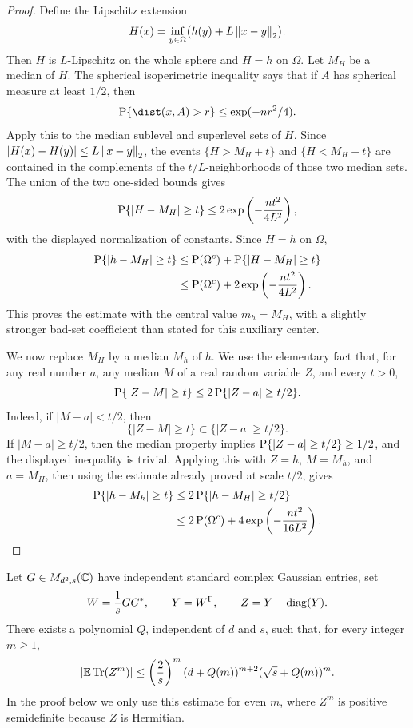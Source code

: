 \begin{proof}
Define the Lipschitz extension
\[
    H(x)=\inf_{y\in\Omega}\bigl(h(y)+L\left\lVert x-y\right\rVert_2\bigr).
\]
Then \(H\) is \(L\)-Lipschitz on the whole sphere and \(H=h\) on \(\Omega\).
Let \(M_H\) be a median of \(H\).  The spherical isoperimetric inequality says
that if \(A\) has spherical measure at least \(1/2\), then
\[
    \Prob\{\dist(x,A)>r\}\le \exp(-nr^2/4).
\]
Apply this to the median sublevel and superlevel sets of \(H\).  Since
\(|H(x)-H(y)|\le L\left\lVert x-y\right\rVert_2\), the events
\(\{H>M_H+t\}\) and \(\{H<M_H-t\}\) are contained in the complements of the
\(t/L\)-neighborhoods of those two median sets.  The union of the two
one-sided bounds gives
\[
    \operatorname{P}\{|H-M_H|\ge t\}
    \le 2\exp\left(-\frac{nt^2}{4L^2}\right),
\]
with the displayed normalization of constants.  Since \(H=h\) on \(\Omega\),
\[
\begin{aligned}
    \operatorname{P}\{|h-M_H|\ge t\}
    &\le \operatorname{P}(\Omega^c)+\operatorname{P}\{|H-M_H|\ge t\}  \\
    &\le \operatorname{P}(\Omega^c)+2\exp\left(-\frac{nt^2}{4L^2}\right).
\end{aligned}
\]
This proves the estimate with the central value \(m_h=M_H\), with a slightly
stronger bad-set coefficient than stated for this auxiliary center.

We now replace \(M_H\) by a median \(M_h\) of \(h\).  We use the elementary
fact that, for any real number \(a\), any median \(M\) of a real random
variable \(Z\), and every \(t>0\),
\[
    \operatorname{P}\{|Z-M|\ge t\}
    \le 2\operatorname{P}\{|Z-a|\ge t/2\}.
\]
Indeed, if \(|M-a|<t/2\), then
\[
    \{|Z-M|\ge t\}\subset \{|Z-a|\ge t/2\}.
\]
If \(|M-a|\ge t/2\), then the median property implies
\(\operatorname{P}\{|Z-a|\ge t/2\}\ge1/2\), and the displayed inequality is trivial.
Applying this with \(Z=h\), \(M=M_h\), and \(a=M_H\), then using the estimate
already proved at scale \(t/2\), gives
\[
\begin{aligned}
    \operatorname{P}\{|h-M_h|\ge t\}
    &\le 2\operatorname{P}\{|h-M_H|\ge t/2\} \\
    &\le 2\operatorname{P}(\Omega^c)
       +4\exp\left(-\frac{nt^2}{16L^2}\right).
\end{aligned}
\]
\end{proof}

\begin{theorem}
\label{lem:aubrun_moment_estimate}
Let \(G\in M_{d^2,s}(\mathbb{C})\) have independent standard complex Gaussian
entries, set
\[
    W=\frac1s GG^*,\qquad Y=W^\Gamma,\qquad Z=Y-\operatorname{diag}(Y).
\]
There exists a polynomial \(Q\), independent of \(d\) and \(s\), such that,
for every integer \(m\ge1\),
\[
    \left|\operatorname{\mathbb{E}}\operatorname{Tr}(Z^m)\right|
    \le
    \left(\frac2s\right)^m
    (d+Q(m))^{m+2}(\sqrt{s}+Q(m))^m.
\]
In the proof below we only use this estimate for even \(m\), where \(Z^m\) is
positive semidefinite because \(Z\) is Hermitian.
\end{theorem}

